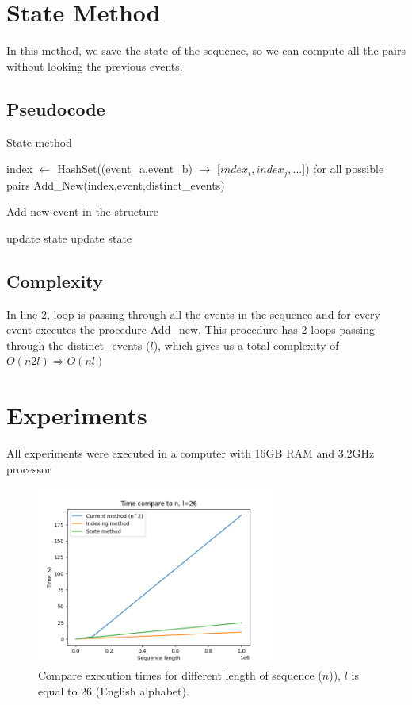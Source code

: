 \documentclass{article}
\begin{document}
\section{State Method}
In this method, we save the state of the sequence, so we can compute all the pairs without looking the previous events.
\subsection{Pseudocode}
\begin{algorithm}
	\caption{State method}
	\label{alg:state}
	\begin{algorithmic}[1]
		\State index $\leftarrow$ HashSet((event\_a,event\_b) $\rightarrow$ [$index_i,index_j,...$]) for all possible pairs
			\State Add\_New(index,event,distinct\_events)
		\EndFor
	\end{algorithmic}
\end{algorithm}
\begin{algorithm}
	\caption{Add new event in the structure}
	\label{alg:add_new}
	\begin{algorithmic}[1]
				\State update state 
			\EndFor
				\State update state
			\EndFor
		\EndProcedure
	\end{algorithmic}
\end{algorithm}
\subsection{Complexity}
In line 2, loop is passing through all the events in the sequence and for every event executes the procedure Add\_new. This procedure has 2 loops passing through the distinct\_events ($l$), which gives us a total complexity of $O(n2l) \Rightarrow O(nl)$

\section{Experiments}
All experiments were executed in a computer with 16GB RAM and 3.2GHz processor
\begin{figure}[tb!]
	\centering	
	\includegraphics[width=0.7\textwidth]{time_compare_methods_3.png}
	\caption{Compare execution times for different length of sequence ($n$)), $l$ is equal to 26 (English alphabet).}
	\label{fig:n}
\end{figure}
\end{document}
